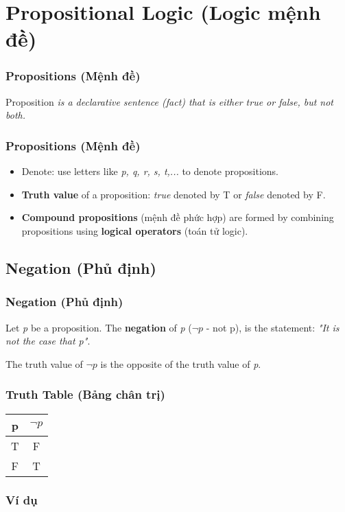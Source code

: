 \documentclass{beamer}
\begin{document}
\section{Propositional Logic (Logic mệnh đề)}    
\begin{frame}
    \frametitle{Propositions (Mệnh đề)}
    \begin{definition}{Proposition}
        \textit{is a declarative sentence (fact) that is either true or false, but not both.}
        \end{definition}
    \end{frame}
    \begin{frame}
        \frametitle{Propositions (Mệnh đề)}
        \begin{itemize}
            \item Denote: use letters like \textit{p, q, r, s, t,...} to denote propositions.
            \item \textbf{Truth value} of a proposition: \textit{true} denoted by T or \textit{false} denoted by F.
            \item \textbf{Compound propositions} (mệnh đề phức hợp) are formed by combining propositions using \textbf{logical operators} (toán tử logic).
        \end{itemize}
        \end{frame}
\subsection{Negation (Phủ định)}
\begin{frame}
    \frametitle{Negation (Phủ định)}
        Let \textit{p} be a proposition. The \textbf{negation} of \textit{p} ($\neg p$ - not p), is the statement: \textit{"It is not the case that p"}.

        The truth value of $\neg p$ is the opposite of the truth value of \textit{p}.
    \end{frame}
    \begin{frame}
        \frametitle{Truth Table (Bảng chân trị)}
        \begin{center}
            \begin{tabular}{|c|c|}
                \hline
                p & $\neg p$\\
                \hline
                T & F \\
                \hline
                F & T \\
                \hline
            \end{tabular}
            \end{center}
        \end{frame}
        \begin{frame}
            \frametitle{Ví dụ}

            \end{frame}
\end{document}
